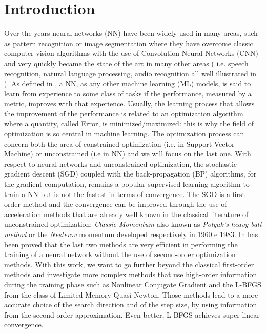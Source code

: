 \section{Introduction}


Over the years neural networks (NN) have been widely used in many areas, such as pattern recognition or image segmentation where they have overcome classic computer vision algorithms with the use of Convolution Neural Networks (CNN) \cite{DBLP:journals/corr/BadrinarayananK15} and very quickly became the state of the art in many other areas ( i.e. speech recognition, natural language processing, audio recognition all well illustrated in \cite{Goodfellow-et-al-2016}). 
As defined in \cite{Mitchell97}, a NN, as any other machine learning (ML) models, is said to learn from experience to some class of tasks if the performance, measured by a metric, improves with that experience.
Usually, the learning process that allows the improvement of the performance is related to an optimization algorithm where a quantity, called Error, is minimized/maximized: this is why the field of optimization is so central in machine learning. The optimization process can concern both the area of constrained optimization (i.e. in Support Vector Machine) or unconstrained (i.e in NN) and we will focus on the last one. With respect to neural networks and unconstrained optimization, the stochastic gradient descent (SGD) coupled with the back-propagation (BP) algorithms, for the gradient computation, remains a popular supervised learning algorithm to train a NN but is not the fastest in terms of convergence. 
The SGD is a first-order method and the convergence can be improved through the use of acceleration methods that are already well known in the classical literature of unconstrained optimization: \textit{Classic Momentum} also known as \textit{Polyak's heavy ball method} \cite{Polyak1964} or the \textit{Nesterov} momentum \cite{10029946121} developed respectively in 1960 e 1983. In \cite{sutskever2013} has been proved that the last two methods are very efficient in performing the training of a neural network without the use of second-order optimization methods. With this work, we want to go further beyond the classical first-order methods and investigate more complex methods that use high-order information during the training phase such as Nonlinear Conjugate Gradient and the L-BFGS from the class of Limited-Memory Quasi-Newton. Those methods lead to  a more accurate choice of the search direction and of the step size, by using information
from the second-order approximation. Even better, L-BFGS achieves super-linear convergence.

